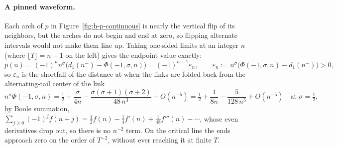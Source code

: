 \documentclass[11pt]{article}
\theoremstyle{definition}
\begin{document}
\paragraph{A pinned waveform.} Each arch of $p$ in
Figure~\ref{fig:h-p-continuous} is nearly the vertical flip of its
neighbors, but the arches do not begin and end at zero, so flipping alternate
intervals would not make them line up. Taking one-sided limits at an integer
$n$ (where $\lfloor T\rfloor=n-1$ on the left) gives the endpoint value
exactly:
\begin{equation}\label{eq:eps-n}
p(n)=(-1)^{n}n^{\sigma}\bigl(d_1(n^-)-\Phi(-1,\sigma,n)\bigr)
=(-1)^{n+1}\varepsilon_n,
\qquad
\varepsilon_n:=n^{\sigma}\bigl(\Phi(-1,\sigma,n)-d_1(n^-)\bigr)>0,
\end{equation}
so $\varepsilon_n$ is the shortfall of the distance at when the links
are folded back from the alternating-tail center of the link
\begin{equation}\label{eq:alt-tail-center}
n^{\sigma}\Phi(-1,\sigma,n)
=\tfrac12+\frac{\sigma}{4n}-\frac{\sigma(\sigma+1)(\sigma+2)}{48\,n^{3}}
+O(n^{-5})
=\tfrac12+\frac{1}{8n}-\frac{5}{128\,n^{3}}+O(n^{-5})
\quad\text{at }\sigma=\tfrac12,
\end{equation}
by Boole summation, $\sum_{j\ge0}(-1)^{j}f(n+j)=\tfrac12f(n)-\tfrac14f'(n)
+\tfrac1{48}f'''(n)-\cdots$, whose even derivatives drop out, so there is no
$n^{-2}$ term. On the critical line the
ends approach zero on the order of $T^{-2}$, without ever reaching it at
finite $T$.
\end{document}

